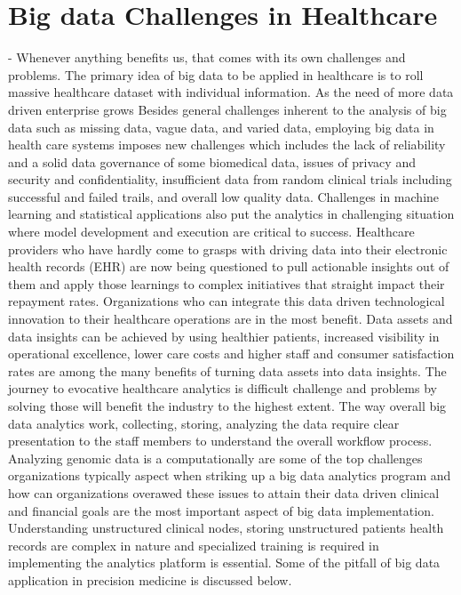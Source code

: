 \documentclass[sigconf]{acmart}
\begin{document}
\section{Big data Challenges in Healthcare}- Whenever anything benefits us, that comes with its own challenges and problems. The primary idea of big data to be applied in healthcare is to roll massive healthcare dataset with individual information. As the need of more data driven enterprise grows Besides general challenges inherent to the analysis of big data such as missing data, vague data, and varied data, employing big data in health care systems imposes new challenges which includes the lack of reliability and a solid data governance of some biomedical data, issues of privacy and security and confidentiality, insufficient data from random clinical trials including successful and failed trails, and overall low quality data. Challenges in machine learning and statistical applications also put the analytics in challenging situation where model development and execution are critical to success\cite{editor05}. 
Healthcare providers who have hardly come to grasps with driving data into their electronic health records (EHR) are now being questioned to pull actionable insights out of them and apply those learnings to complex initiatives that straight impact their repayment rates. Organizations who can integrate this data driven technological innovation to their healthcare operations are in the most benefit\cite{editor07}. Data assets and data insights can be achieved by using healthier patients, increased visibility in operational excellence, lower care costs and higher staff and consumer satisfaction rates are among the many benefits of turning data assets into data insights. The journey to evocative healthcare analytics is difficult challenge and problems by solving those will benefit the industry to the highest extent. The way overall big data analytics work, collecting, storing, analyzing the data require clear presentation to the staff members to understand the overall workflow process\cite{editor03}. Analyzing genomic data is a computationally are some of the top challenges organizations typically aspect when striking up a big data analytics program and how can organizations overawed these issues to attain their data driven clinical and financial goals are the most important aspect of big data implementation. Understanding unstructured clinical nodes, storing unstructured patients health records are complex in nature and specialized training is required in implementing the analytics platform is essential. Some of the pitfall of big data application in precision medicine is discussed below.
\end{document}
